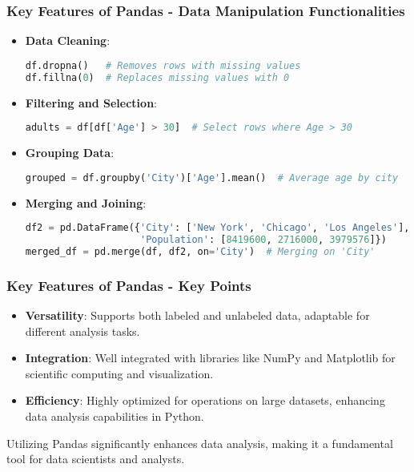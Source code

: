 \documentclass[aspectratio=169]{beamer}
\begin{document}
\begin{frame}[fragile]
    \frametitle{Key Features of Pandas - Data Manipulation Functionalities}
    \begin{itemize}
        \item \textbf{Data Cleaning}:
        \begin{lstlisting}[language=Python]
df.dropna()   # Removes rows with missing values
df.fillna(0)  # Replaces missing values with 0
        \end{lstlisting}

        \item \textbf{Filtering and Selection}:
        \begin{lstlisting}[language=Python]
adults = df[df['Age'] > 30]  # Select rows where Age > 30
        \end{lstlisting}

        \item \textbf{Grouping Data}:
        \begin{lstlisting}[language=Python]
grouped = df.groupby('City')['Age'].mean()  # Average age by city
        \end{lstlisting}

        \item \textbf{Merging and Joining}:
        \begin{lstlisting}[language=Python]
df2 = pd.DataFrame({'City': ['New York', 'Chicago', 'Los Angeles'],
                    'Population': [8419600, 2716000, 3979576]})
merged_df = pd.merge(df, df2, on='City')  # Merging on 'City'
        \end{lstlisting}
    \end{itemize}
\end{frame}

\begin{frame}[fragile]
    \frametitle{Key Features of Pandas - Key Points}
    \begin{itemize}
        \item \textbf{Versatility}: Supports both labeled and unlabeled data, adaptable for different analysis tasks.
        \item \textbf{Integration}: Well integrated with libraries like NumPy and Matplotlib for scientific computing and visualization.
        \item \textbf{Efficiency}: Highly optimized for operations on large datasets, enhancing data analysis capabilities in Python.
    \end{itemize}
    
    Utilizing Pandas significantly enhances data analysis, making it a fundamental tool for data scientists and analysts.
\end{frame}
\end{document}
